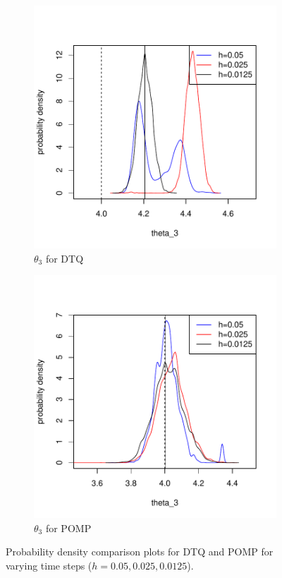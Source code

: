 \documentclass[a4paper,11pt]{article}
\begin{document}
\begin{figure}[H]
\medskip
\begin{subfigure}{0.48\textwidth}
\includegraphics[width=\linewidth]{dtq_theta3.pdf}
\caption{$\theta_3$ for DTQ} \label{fig:e}
\end{subfigure}\hspace*{\fill}
\begin{subfigure}{0.48\textwidth}
\includegraphics[width=\linewidth]{pomp_theta3.pdf}
\caption{$\theta_3$ for POMP} \label{fig:f}
\end{subfigure}

\caption{Probability density comparison plots for DTQ and POMP for varying time steps ($h = 0.05, 0.025, 0.0125$).} \label{fig:1}
\end{figure}
 
\end{document}
